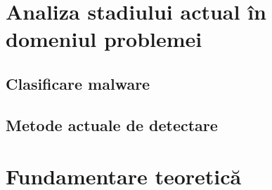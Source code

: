 \documentclass[12pt,a4paper]{report}
\begin{document}
\chapter{Analiza stadiului actual în domeniul problemei}
\section{Clasificare malware}
\section{Metode actuale de detectare}

\chapter{Fundamentare teoretică}
\end{document}
